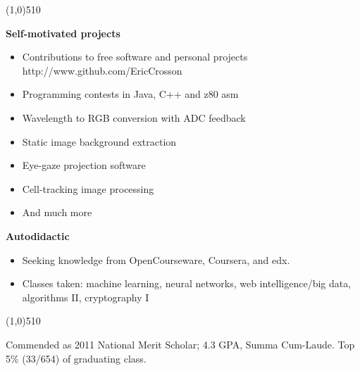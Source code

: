 \documentclass{report}
\newcommand{\cut}{\begin{center} \line(1,0){510} \end{center}}
\begin{document}
\cut

\textbf{Self-motivated projects}
\begin{paracol}{2}

  \begin{itemize}
    \renewcommand{\labelitemi}{$\circ$}
  \item Contributions to free software and personal projects
    http://www.github.com/EricCrosson
  \item Programming contests in Java, C++ and z80 asm
  \item Wavelength to RGB conversion with ADC feedback
  \end{itemize}

  \switchcolumn
  \begin{itemize}
    \renewcommand{\labelitemi}{$\circ$}
  \item Static image background extraction
  \item Eye-gaze projection software
  \item Cell-tracking image processing
  \item And much more
  \end{itemize}
\end{paracol}

\textbf{Autodidactic}
\begin{itemize}
  \renewcommand{\labelitemi}{$\circ$}
\item Seeking knowledge from OpenCourseware, Coursera, and edx.
\item Classes taken: machine learning, neural networks, web intelligence/big data, algorithms II, cryptography I
\end{itemize}

\cut{}

Commended as 2011 National Merit Scholar; 4.3 GPA, Summa Cum-Laude. Top 5\% (33/654) of graduating class.
\end{document}
